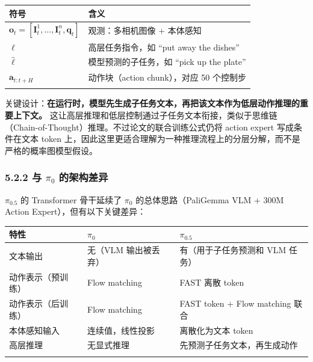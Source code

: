 \documentclass[
  chinese,
]{ctexart}
\begin{document}
\begin{center}
\begin{tabular}{@{}>{\raggedright\arraybackslash}p{} >{\raggedright\arraybackslash}p{}@{}}
\toprule\noalign{}
符号 & 含义 \\
\midrule\noalign{}
\(\mathbf{o}_t = [\mathbf{I}^1_t, \ldots, \mathbf{I}^n_t, \mathbf{q}_t]\) & 观测：多相机图像 + 本体感知 \\
\(\ell\) & 高层任务指令，如 ``put away the dishes'' \\
\(\hat{\ell}\) & 模型预测的子任务，如 ``pick up the plate'' \\
\(\mathbf{a}_{t:t+H}\) & 动作块（action chunk），对应 50 个控制步 \\
\bottomrule\noalign{}
\end{tabular}
\end{center}

关键设计：\textbf{在运行时，模型先生成子任务文本，再把该文本作为低层动作推理的重要上下文。}
这让高层推理和低层控制通过子任务文本衔接，类似于思维链（Chain-of-Thought）推理。不过论文的联合训练公式仍将
action expert 写成条件在文本 token
上，因此这里更适合理解为一种推理流程上的分层分解，而不是严格的概率图模型假设。

\subsubsection{\texorpdfstring{5.2.2 与 \(\pi_0\)
的架构差异}{5.2.2 与 \textbackslash pi\_0 的架构差异}}\label{ux4e0e-pi_0-ux7684ux67b6ux6784ux5deeux5f02}

\(\pi_{0.5}\) 的 Transformer 骨干延续了 \(\pi_0\) 的总体思路（PaliGemma
VLM + 300M Action Expert），但有以下关键差异：

\begin{center}
\begin{tabular}{@{}>{\raggedright\arraybackslash}p{} >{\raggedright\arraybackslash}p{} >{\raggedright\arraybackslash}p{}@{}}
\toprule\noalign{}
特性 & \(\pi_0\) & \(\pi_{0.5}\) \\
\midrule\noalign{}
文本输出 & 无（VLM 输出被丢弃） & 有（用于子任务预测和 VLM 任务） \\
动作表示（预训练） & Flow matching & FAST 离散 token \\
动作表示（后训练） & Flow matching & FAST token + Flow matching 联合 \\
本体感知输入 & 连续值，线性投影 & 离散化为文本 token \\
高层推理 & 无显式推理 & 先预测子任务文本，再生成动作 \\
\bottomrule\noalign{}
\end{tabular}
\end{center}
\end{document}
